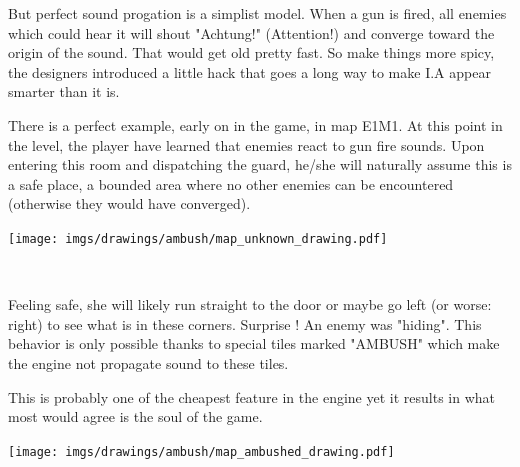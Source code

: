 But perfect sound progation is a simplist model. When a gun is fired, all enemies which could hear it will shout "Achtung!" (Attention!) and converge toward the origin of the sound. That would get old pretty fast. So make things more spicy, the designers introduced a little hack that goes a long way to make I.A appear smarter than it is.


\par
\begin{minipage}{1\textwidth}
\begin{figure}[H]
 \centering
\end{figure}
\par


  \begin{minipage}{0.6\textwidth}
  There is a perfect example, early on in the game, in map E1M1. At this point in the level, the player have learned that enemies react to gun fire sounds. Upon entering this room and dispatching the guard, he/she will naturally assume this is a safe place, a bounded area where no other enemies can be encountered (otherwise they would have converged).
  \end{minipage}
  \begin{minipage}{0.4\textwidth}
  \begin{flushright}
  \texttt{[image: imgs/drawings/ambush/map\_unknown\_drawing.pdf]}
  \end{flushright}  
  \end{minipage}
\end{minipage}
\noindent
\\


\par
\begin{minipage}{1\textwidth}
  \begin{figure}[H]
   \centering
  \end{figure}
  \par
  \begin{minipage}{0.6\textwidth}
  Feeling safe, she will likely run straight to the door or maybe go left (or worse: right) to see what is in these corners. Surprise ! An enemy was "hiding". This behavior is only possible thanks to special tiles marked "AMBUSH" which make the engine not propagate sound to these tiles.\\
  \par
   This is probably one of the cheapest feature in the engine yet it results in what most would agree is the soul of the game.
  \end{minipage}
  \begin{minipage}{0.4\textwidth}
  \begin{flushright}
  \texttt{[image: imgs/drawings/ambush/map\_ambushed\_drawing.pdf]}
  \end{flushright}
  \end{minipage}
\end{minipage}
\noindent
\\


